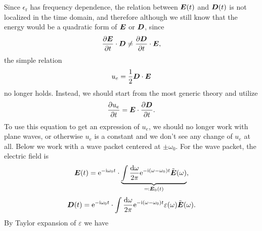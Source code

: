 \documentclass[hyperref, a4paper]{article}
\newcommand*{\ii}{\mathrm{i}}
\newcommand*{\ee}{\mathrm{e}}
\newcommand{\epsr}{\epsilon_{\text{r}}}
\newcommand{\Efreq}{\tilde{\vb*{E}}}
\begin{document}
Since $\epsr$ has frequency dependence,
the relation between $\vb*{E}(t)$ and $\vb*{D}(t)$ 
is not localized in the time domain,
and therefore although we still know that 
the energy would be a quadratic form of $\vb*{E}$ or $\vb*{D}$,
since 
\begin{equation}
    \pdv{\vb*{E}}{t} \cdot \vb*{D} \neq \pdv{\vb*{D}}{t} \cdot \vb*{E},
\end{equation}
the simple relation 
\[
    u_e = \frac{1}{2} \vb*{D} \cdot \vb*{E} 
\]
no longer holds.
Instead, we should start from the most generic theory 
and utilize 
\begin{equation}
    \pdv{u_e}{t} = \vb*{E} \cdot \pdv{\vb*{D}}{t}.
\end{equation} 
To use this equation to get an expression of $u_e$,
we should no longer work with plane waves, 
or otherwise $u_e$ is a constant and 
we don't see any change of $u_e$ at all.
Below we work with a wave packet centered at $\pm \omega_0$.
For the wave packet, the electric field is 
\begin{equation}
    \vb*{E}(t) = \ee^{- \ii \omega_0 t} \cdot 
        \underbrace{
            \int \frac{\dd{\omega}}{2\pi} \ee^{- \ii (\omega - \omega_0) t}
            \Efreq(\omega)
        }_{\eqqcolon \vb*{E}_0(t)},
\end{equation}
\begin{equation}
    \vb*{D}(t) = \ee^{- \ii \omega_0 t} \cdot 
        \int \frac{\dd{\omega}}{2\pi} \ee^{- \ii (\omega - \omega_0) t}
            \varepsilon(\omega) \Efreq(\omega) .
\end{equation}
By Taylor expansion of $\varepsilon$ we have 
\end{document}
